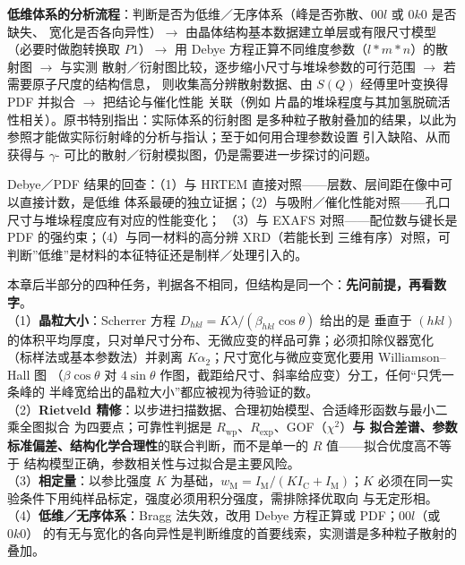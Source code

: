 \begin{dataflow}
\textbf{低维体系的分析流程}：判断是否为低维／无序体系（峰是否弥散、$00l$ 或 $0k0$ 是否缺失、
宽化是否各向异性）$\rightarrow$ 由晶体结构基本数据建立单层或有限尺寸模型（必要时做胞转换取
$P1$）$\rightarrow$ 用 Debye 方程正算不同维度参数（$l*m*n$）的散射图 $\rightarrow$ 与实测
散射／衍射图比较，逐步缩小尺寸与堆垛参数的可行范围 $\rightarrow$ 若需要原子尺度的结构信息，
则收集高分辨散射数据、由 $S(Q)$ 经傅里叶变换得 PDF 并拟合 $\rightarrow$ 把结论与催化性能
关联（例如  片晶的堆垛程度与其加氢脱硫活性相关）。原书特别指出：实际体系的衍射图
是多种粒子散射叠加的结果，以此为参照才能做实际衍射峰的分析与指认；至于如何用合理参数设置
引入缺陷、从而获得与 $\gamma$- 可比的散射／衍射模拟图，仍是需要进一步探讨的问题。
\end{dataflow}

\begin{crosscheck}
Debye／PDF 结果的回查：（1）与 HRTEM 直接对照——层数、层间距在像中可以直接计数，是低维
体系最硬的独立证据；（2）与吸附／催化性能对照——孔口尺寸与堆垛程度应有对应的性能变化；
（3）与 EXAFS 对照——配位数与键长是 PDF 的强约束；（4）与同一材料的高分辨 XRD（若能长到
三维有序）对照，可判断''低维''是材料的本征特征还是制样／处理引入的。
\end{crosscheck}

\begin{methodsum}
本章后半部分的四种任务，判据各不相同，但结构是同一个：\textbf{先问前提，再看数字}。\\
（1）\textbf{晶粒大小}：Scherrer 方程 $D_{hkl}=K\lambda/(\beta_{hkl}\cos\theta)$ 给出的是
垂直于 $(hkl)$ 的体积平均厚度，只对单尺寸分布、无微应变的样品可靠；必须扣除仪器宽化
（标样法或基本参数法）并剥离 $K\alpha_{2}$；尺寸宽化与微应变宽化要用 Williamson--Hall 图
（$\beta\cos\theta$ 对 $4\sin\theta$ 作图，截距给尺寸、斜率给应变）分工，任何``只凭一条峰的
半峰宽给出的晶粒大小''都应被视为待验证的数。\\
（2）\textbf{Rietveld 精修}：以步进扫描数据、合理初始模型、合适峰形函数与最小二乘全图拟合
为四要点；可靠性判据是 $R_{\mathrm{wp}}$、$R_{\mathrm{exp}}$、GOF（$\chi^{2}$）\textbf{与
拟合差谱、参数标准偏差、结构化学合理性}的联合判断，而不是单一的 $R$ 值——拟合优度高不等于
结构模型正确，参数相关性与过拟合是主要风险。\\
（3）\textbf{相定量}：以参比强度 $K$ 为基础，$w_{\mathrm{M}}=I_{\mathrm{M}}/(K I_{\mathrm{C}}
+I_{\mathrm{M}})$；$K$ 必须在同一实验条件下用纯样品标定，强度必须用积分强度，需排除择优取向
与无定形相。\\
（4）\textbf{低维／无序体系}：Bragg 法失效，改用 Debye 方程正算或 PDF；$00l$（或 $0k0$）
的有无与宽化的各向异性是判断维度的首要线索，实测谱是多种粒子散射的叠加。
\end{methodsum}

